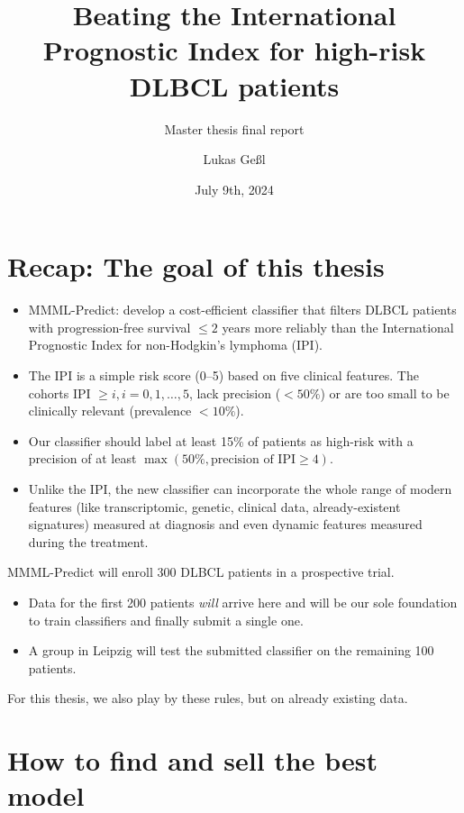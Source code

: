 \documentclass[10pt, aspectratio=169]{beamer}
\title{Beating the International Prognostic Index for high-risk DLBCL patients}
\subtitle{Master thesis final report}
\date{July 9th, 2024}
\author{Lukas Geßl}
\institute{Chair of Statistical Bioinformatics, Regensburg University}
\begin{document}
\maketitle

\section{Recap: The goal of this thesis}

\begin{frame}{}
  \begin{itemize}
    \item MMML-Predict: develop a cost-efficient classifier 
    that filters DLBCL patients with progression-free survival $\leq 2$ years more reliably 
    than the International Prognostic Index for non-Hodgkin's lymphoma (IPI).
    \pause
    \item The IPI \cite{ipi93} is a simple risk score (0--5) based on five clinical features. 
    The cohorts IPI $\geq i, i = 0, 1, \ldots, 5$, lack precision ($< 50 \%$) or 
    are too small to be clinically relevant (prevalence $< 10 \%$).
    \pause
    \item Our classifier should label at least 15\% of patients as high-risk with a precision
    of at least $\max(50\%, \text{precision of IPI} \geq 4)$.
    \pause
    \item Unlike the IPI, the new classifier can incorporate the whole range of 
    modern features (like transcriptomic, genetic, clinical data, already-existent 
    signatures) measured at diagnosis and even dynamic features measured during 
    the treatment.
  \end{itemize}
\end{frame}

\begin{frame}
  MMML-Predict will enroll 300 DLBCL patients in a prospective trial.
  \begin{itemize}
    \item Data for the first 200 patients \textit{will} arrive here and will be 
      our sole foundation to train classifiers and finally submit a single one.
    \item A group in Leipzig will test the submitted classifier on the remaining 
      100 patients.
  \end{itemize}
  \pause
  For this thesis, we also play by these rules, but on already existing data.
\end{frame}

\section{How to find and sell the best model}
\end{document}
